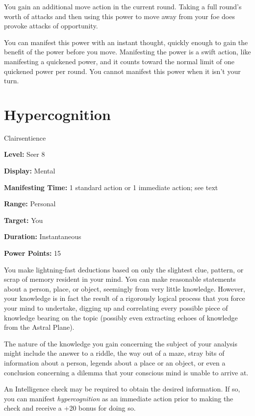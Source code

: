 \documentclass{article}
\begin{document}
You gain an additional move action in the current round. Taking a full round's 
worth of attacks and then using this power to move away from your foe does provoke 
attacks of opportunity.

You can manifest this power with an instant thought, quickly enough to gain the 
benefit of the power before you move. Manifesting the power is a swift action, 
like manifesting a quickened power, and it counts toward the normal limit of one 
quickened power per round. You cannot manifest this power when it isn't your turn.

\vspace{12pt}
\section*{Hypercognition}

Clairsentience

\textbf{Level:} Seer 8

\textbf{Display:} Mental

\textbf{Manifesting Time:} 1 standard action or 1 immediate action; see text

\textbf{Range:} Personal

\textbf{Target:} You

\textbf{Duration:} Instantaneous

\textbf{Power Points:} 15

You make lightning-fast deductions based on only the slightest clue, pattern, or 
scrap of memory resident in your mind. You can make reasonable statements about 
a person, place, or object, seemingly from very little knowledge. However, your 
knowledge is in fact the result of a rigorously logical process that you force 
your mind to undertake, digging up and correlating every possible piece of knowledge 
bearing on the topic (possibly even extracting echoes of knowledge from the Astral 
Plane).

The nature of the knowledge you gain concerning the subject of your analysis might 
include the answer to a riddle, the way out of a maze, stray bits of information 
about a person, legends about a place or an object, or even a conclusion concerning 
a dilemma that your conscious mind is unable to arrive at.

An Intelligence check may be required to obtain the desired information. If so, 
you can manifest \textit{hypercognition }as an immediate action prior to making 
the check and receive a +20 bonus for doing so.

\vspace{12pt}
\end{document}

